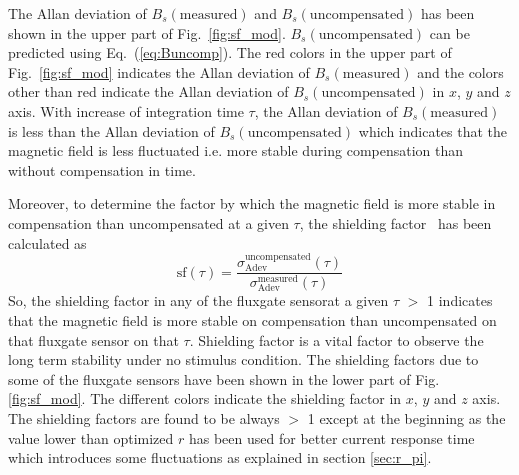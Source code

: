 The Allan deviation of $B_s(\text{measured})$ and $B_s(\text{uncompensated})$ has been shown in the upper part of Fig.~\ref{fig:sf_mod}. $B_s(\text{uncompensated})$ can be predicted using Eq.~(\ref{eq:Buncomp}). The red colors in the upper part of Fig.~\ref{fig:sf_mod} indicates the Allan deviation of $B_s(\text{measured})$ and the colors other than red indicate the  Allan deviation of $B_s(\text{uncompensated})$ in $x$, $y$ and $z$ axis. With increase of integration time $\tau$, the Allan deviation of $B_s(\text{measured})$ is less than the  Allan deviation of $B_s(\text{uncompensated})$ which indicates that the magnetic field is less fluctuated i.e. more stable during compensation than without compensation in time. 

\FloatBarrier

Moreover, to determine the factor by which the magnetic field is more stable in compensation than uncompensated at a given $\tau$, the shielding factor~\cite{bea} has been calculated as
\begin{equation}\label{eq:sf}
    \text{sf} (\tau)=\frac{\sigma_{\text{Adev}}^{\text{uncompensated}}(\tau)}{\sigma_{\text{Adev}}^{\text{measured}}(\tau)}
\end{equation}
So, the shielding factor in any of the fluxgate sensorat a given $\tau$  $>$ 1 indicates that the magnetic field is more stable on compensation than uncompensated on that fluxgate sensor on that $\tau$. Shielding factor is a vital factor to observe the long term stability under no stimulus condition. The shielding factors due to some of the fluxgate sensors have been shown in the lower part of Fig. \ref{fig:sf_mod}. The different colors indicate the  shielding factor in $x$, $y$ and $z$ axis. The shielding factors are found to be always $>$ 1 except at the beginning as the value lower than optimized $r$ has been used for better current response time which introduces some fluctuations as explained in section \ref{sec:r_pi}.
 

 
 
 